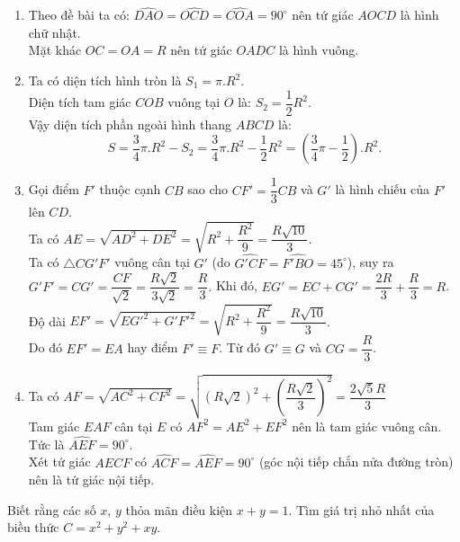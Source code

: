 \begin{ex}
{\begin{center}
    \end{center}
\begin{enumerate}
	\item  Theo đề bài ta có: $\widehat{DAO} = \widehat{OCD} = \widehat{COA} = 90^\circ$ nên tứ giác $AOCD$ là hình chữ nhật.\\
	Mặt khác $OC = OA = R$ nên tứ giác $OADC$ là hình vuông.
	\item  Ta có diện tích hình tròn là $S_1 = \pi. R^2$.\\
	Diện tích tam giác $COB$ vuông tại $O$ là: $S_2 = \dfrac{1}{2}R^2$.\\
	Vậy diện tích phần ngoài hình thang $ABCD$ là:\\ $$S = \dfrac{3}{4}\pi.R^2- S_2 = \dfrac{3}{4}\pi.R^2 - \dfrac{1}{2}R^2 = \left(\dfrac{3}{4}\pi - \dfrac{1}{2}\right).R^2.$$
	\item Gọi điểm $F'$ thuộc cạnh $CB$ sao cho $CF'=\dfrac{1}{3}CB$ và $G'$ là hình chiếu của $F'$ lên $CD$. 
	\\Ta có $AE=\sqrt{AD^2+DE^2}=\sqrt{R^2+\dfrac{R^2}{9}}=\dfrac{R\sqrt{10}}{3}.$
\\	Ta có $\triangle CG'F'$ vuông cân tại $G'$ (do $\widehat{G'CF}=\widehat{F'BO}=45^{\circ}$), suy ra $G'F'=CG'=\dfrac{CF}{\sqrt{2}}=\dfrac{R\sqrt{2}}{3\sqrt{2}}=\dfrac{R}{3}.$ Khi đó, $EG'=EC+CG'=\dfrac{2R}{3}+\dfrac{R}{3}=R$.  
\\Độ dài $EF'=\sqrt{EG'^2+G'F'^2}=\sqrt{R^2+\dfrac{R^2}{9}}=\dfrac{R\sqrt{10}}{3}$.
\\Do đó $EF'=EA$ hay điểm $F'\equiv F$. Từ đó $G'\equiv G$ và $CG=\dfrac{R}{3}$.
 	\item Ta có $AF=\sqrt{AC^2+CF^2}=\sqrt{(R\sqrt{2})^2+\left(\dfrac{R\sqrt{2}}{3}\right)^2}=\dfrac{2\sqrt{5}R}{3}$
\\Tam giác $EAF$ cân tại $E$ có $AF^2=AE^2+EF^2$ nên là tam giác vuông cân. Tức là $\widehat{AEF}=90^{\circ}$.\\
 	Xét tứ giác $AECF$ có $\widehat{ACF} = \widehat{AEF} = 90^\circ$ (góc nội tiếp chắn nửa đường tròn) nên là tứ giác nội tiếp.
\end{enumerate}
    }
\end{ex}

\begin{ex}%
 Biết rằng các số $x$, $y$ thỏa mãn điều kiện $x + y = 1$. Tìm giá trị nhỏ nhất của biều thức $C = x^2 + y^2 + xy$.
\end{ex}


